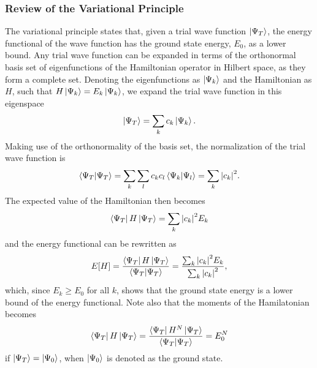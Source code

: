 \subsubsection{Review of the Variational Principle}\label{sec:variational_principle}
The variational principle states that, given a trial wave function $\ket{\Psi_T}$, the energy functional of the wave function has the ground state energy, $E_0$, as a lower bound. Any trial wave function can be expanded in terms of the orthonormal basis set of eigenfunctions of the Hamiltonian operator in Hilbert space, as they form a complete set. Denoting the eigenfunctions as $\ket{\Psi_k}$ and the Hamiltonian as $H$, such that $H\ket{\Psi_k}=E_k\ket{\Psi_k}$, we expand the trial wave function in this eigenspace
\begin{equation*}
    \ket{\Psi_T} = \sum_{k}c_k\ket{\Psi_k}.
\end{equation*}
Making use of the orthonormality of the basis set, the normalization of the trial wave function is 
\begin{equation*}
    \braket{\Psi_T} = \sum_k\sum_l c_kc_l\braket{\Psi_k}{\Psi_l} = \sum_k \abs{c_k}^2.
\end{equation*}
The expected value of the Hamiltonian then becomes
\begin{equation}\label{eq:energy_functional_basis_set}
    \bra{\Psi_T}H\ket{\Psi_T} = \sum_k\abs{c_k}^2E_k
\end{equation}
and the energy functional can be rewritten as 
\begin{equation}
    E[H] = \frac{\bra{\Psi_T}H\ket{\Psi_T}}{\braket{\Psi_T}} = \frac{\sum_k\abs{c_k}^2E_k}{\sum_k\abs{c_k}^2}, 
\end{equation}
which, since $E_k\geq E_0$ for all $k$, shows that the ground state energy is a lower bound of the energy functional. Note also that the moments of the Hamilatonian becomes 
\begin{equation}
    \bra{\Psi_T}H\ket{\Psi_T} = \frac{\bra{\Psi_T}H^N\ket{\Psi_T}}{\braket{\Psi_T}} = E_0^N
\end{equation}
if $\ket{\Psi_T}=\ket{\Psi_0}$, when $\ket{\Psi_0}$ is denoted as the ground state. 

